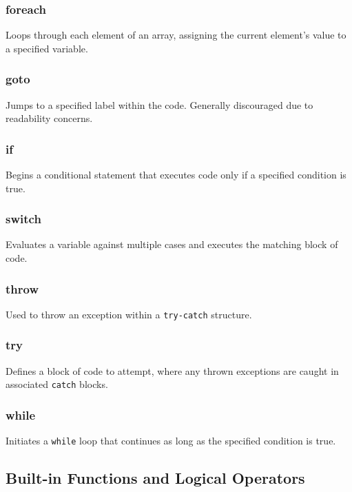 \documentclass{report}
\begin{document}
\bigbreak \noindent 
\subsubsection{foreach}
\bigbreak \noindent 
Loops through each element of an array, assigning the current element’s value to a specified variable.

\bigbreak \noindent 
\subsubsection{goto}
\bigbreak \noindent 
Jumps to a specified label within the code. Generally discouraged due to readability concerns.

\bigbreak \noindent 
\subsubsection{if}
\bigbreak \noindent 
Begins a conditional statement that executes code only if a specified condition is true.

\bigbreak \noindent 
\subsubsection{switch}
\bigbreak \noindent 
Evaluates a variable against multiple cases and executes the matching block of code.

\bigbreak \noindent 
\subsubsection{throw}
\bigbreak \noindent 
Used to throw an exception within a \texttt{try-catch} structure.

\bigbreak \noindent 
\subsubsection{try}
\bigbreak \noindent 
Defines a block of code to attempt, where any thrown exceptions are caught in associated \texttt{catch} blocks.

\bigbreak \noindent 
\subsubsection{while}
\bigbreak \noindent 
Initiates a \texttt{while} loop that continues as long as the specified condition is true.

\pagebreak
\subsection{Built-in Functions and Logical Operators}
\bigbreak \noindent 
\end{document}
